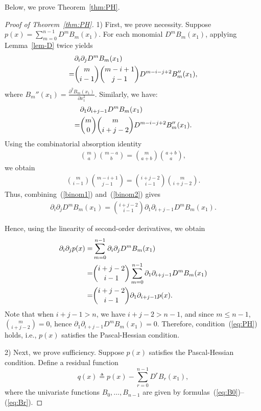 \documentclass[11pt]{article}
\begin{document}
Below, we prove Theorem~\ref{thm:PH}.
\begin{proof}[Proof of Theorem~\ref{thm:PH}]
	1) First, we prove necessity. Suppose $p(x) = \sum_{m=0}^{n-1} D^m B_m(x_1)$. For each monomial $D^m B_m(x_1)$, applying Lemma~\ref{lem-D} twice yields
	\begin{align}\label{binom1}
		&\partial_i\partial_j D^m B_m(x_1) \notag\\
		= &\binom{m}{i-1}\binom{m-i+1}{j-1} D^{m-i-j+2} B_m''(x_1),
	\end{align}
	where $B_m''(x_1)=\frac{\partial^2B_m(x_1)}{\partial x_1^2}$. Similarly, we have:
	\begin{align}\label{binom2}
		&\partial_1\partial_{i+j-1} D^m B_m(x_1) \notag\\
		=& \binom{m}{0}\binom{m}{i+j-2} D^{m-i-j+2} B_m''(x_1).
	\end{align}
	Using the combinatorial absorption identity
	\begin{align}
		\binom{m}{a}\binom{m-a}{b}=\binom{m}{a+b}\binom{a+b}{a},
	\end{align}
	we obtain
	\begin{align}
		\binom{m}{i-1}\binom{m-i+1}{j-1}=\binom{i+j-2}{i-1}\binom{m}{i+j-2}.
	\end{align}
	Thus, combining~(\ref{binom1}) and~(\ref{binom2}) gives
	\begin{align}\label{binom3}
		\partial_i\partial_j D^m B_m(x_1) = \binom{i+j-2}{i-1} \partial_1\partial_{i+j-1} D^m B_m(x_1).
	\end{align}
	
	Hence, using the linearity of second-order derivatives, we obtain
	\begin{align}
		\partial_i\partial_j p(x) =& \sum_{m=0}^{n-1} \partial_i\partial_j D^m B_m(x_1)
		\notag\\
		=& \binom{i+j-2}{i-1} \sum_{m=0}^{n-1} \partial_1 \partial_{i+j-1} D^m B_m(x_1)
		\notag\\
		=& \binom{i+j-2}{i-1} \partial_1 \partial_{i+j-1} p(x).
	\end{align}
	Note that when $i+j-1 > n$, we have $i+j-2 > n-1$, and since $m \leq n-1$, $\binom{m}{i+j-2}=0$, hence $\partial_1\partial_{i+j-1} D^m B_m(x_1) = 0$. Therefore, condition~(\ref{eq:PH}) holds, i.e., $p(x)$ satisfies the Pascal-Hessian condition.

	2) Next, we prove sufficiency. Suppose $p(x)$ satisfies the Pascal-Hessian condition. Define a residual function
	\begin{equation}\label{eq:res}
		q(x) \triangleq p(x) - \sum_{r=0}^{n-1} D^r B_r(x_1),
	\end{equation}
	where the univariate functions $B_0,\ldots,B_{n-1}$ are given by formulas~(\ref{eq:B0})--(\ref{eq:Br}).
	

\end{proof}
\end{document}
